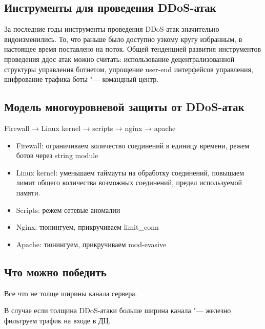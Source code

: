 \documentclass[10pt, a5paper]{article}
\begin{document}
\subsection*{Инструменты для проведения DDoS-атак}
За последние годы инструменты проведения DDoS-атак значительно видоизменились. То, что раньше было доступно узкому кругу избранным, в настоящее время поставлено на поток. Общей  тенденцией развития инструментов проведения ддос атак можно считать: использование децентрализованной структуры управления \linebreak ботнетом, упрощение user-end интерфейсов управления, шифрование трафика боты "--- командный центр.

\subsection*{Модель многоуровневой защиты от DDoS-атак}
Firewall → Linux kernel → scripts → nginx → apache
\begin{itemize}
\item Firewall: ограничиваем количество соединений в единицу времени, режем ботов через  string module
\item Linux kernel: уменьшаем таймауты на обработку соединений, повышаем лимит общего количества возможных соединений, предел используемой памяти.
\item Scripts: режем сетевые аномалии
\item Nginx: тюнингуем, прикручиваем  limit\_conn
\item Apache: тюнингуем, прикручиваем mod-evasive
\end{itemize}

\subsection*{Что можно победить}
Все что не толще ширины канала сервера.

В случае если толщина DDoS-атаки больше ширина канала "--- железно фильтруем трафик на входе в ДЦ.
\end{document}
